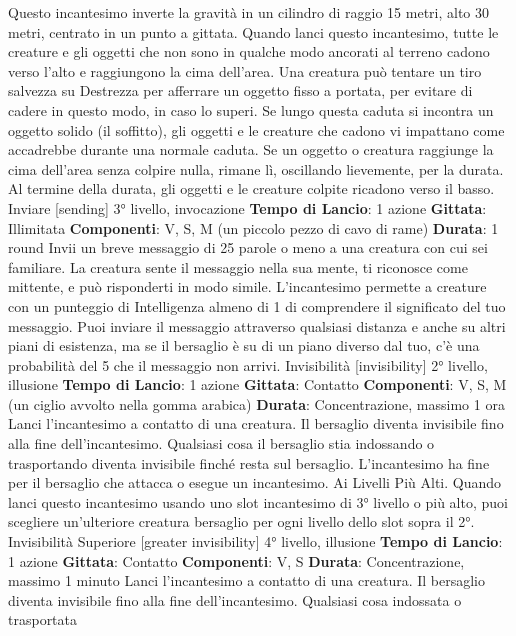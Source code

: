 \begin{multicols}{2}
Questo incantesimo inverte la gravità in un cilindro di
raggio 15 metri, alto 30 metri, centrato in un punto a
gittata. Quando lanci questo incantesimo, tutte le
creature e gli oggetti che non sono in qualche modo
ancorati al terreno cadono verso l’alto e raggiungono la
cima dell’area. Una creatura può tentare un tiro
salvezza su Destrezza per afferrare un oggetto fisso a
portata, per evitare di cadere in questo modo, in caso lo
superi.
Se lungo questa caduta si incontra un oggetto solido (il
soffitto), gli oggetti e le creature che cadono vi
impattano come accadrebbe durante una normale
caduta. Se un oggetto o creatura raggiunge la cima
dell’area senza colpire nulla, rimane lì, oscillando
lievemente, per la durata.
Al termine della durata, gli oggetti e le creature colpite
ricadono verso il basso.
Inviare
[sending]
3° livello, invocazione
\textbf{Tempo di Lancio}: 1 azione
\textbf{Gittata}: Illimitata
\textbf{Componenti}: V, S, M (un piccolo pezzo di cavo di
rame)
\textbf{Durata}: 1 round
Invii un breve messaggio di 25 parole o meno a una
creatura con cui sei familiare. La creatura sente il
messaggio nella sua mente, ti riconosce come mittente,
e può risponderti in modo simile. L’incantesimo
permette a creature con un punteggio di Intelligenza
almeno di 1 di comprendere il significato del tuo
messaggio.
Puoi inviare il messaggio attraverso qualsiasi distanza e
anche su altri piani di esistenza, ma se il bersaglio è su
di un piano diverso dal tuo, c’è una probabilità del 5%
che il messaggio non arrivi.
Invisibilità
[invisibility]
2° livello, illusione
\textbf{Tempo di Lancio}: 1 azione
\textbf{Gittata}: Contatto
\textbf{Componenti}: V, S, M (un ciglio avvolto nella gomma
arabica)
\textbf{Durata}: Concentrazione, massimo 1 ora
Lanci l’incantesimo a contatto di una creatura. Il
bersaglio diventa invisibile fino alla fine
dell’incantesimo. Qualsiasi cosa il bersaglio stia
indossando o trasportando diventa invisibile finché
resta sul bersaglio. L’incantesimo ha fine per il
bersaglio che attacca o esegue un incantesimo.
Ai Livelli Più Alti. Quando lanci questo incantesimo
usando uno slot incantesimo di 3° livello o più alto, puoi
scegliere un’ulteriore creatura bersaglio per ogni livello
dello slot sopra il 2°.
Invisibilità Superiore
[greater invisibility]
4° livello, illusione
\textbf{Tempo di Lancio}: 1 azione
\textbf{Gittata}: Contatto
\textbf{Componenti}: V, S
\textbf{Durata}: Concentrazione, massimo 1 minuto
Lanci l’incantesimo a contatto di una creatura. Il
bersaglio diventa invisibile fino alla fine
dell’incantesimo. Qualsiasi cosa indossata o trasportata

\end{multicols}
